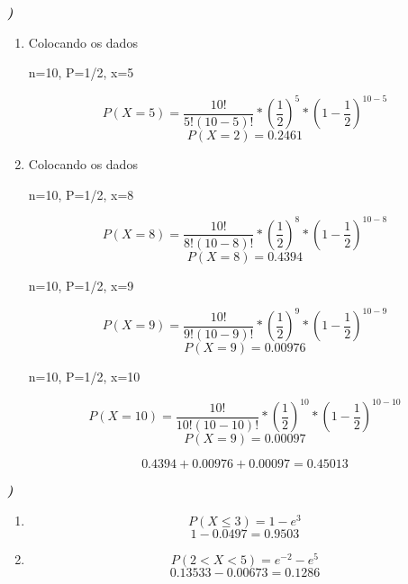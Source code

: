 \documentclass[12pt]{article}
\newcounter{instn}
\newcommand{\instnum}{\arabic{instn}}
\newcommand{\myline}[1]{
    \emph{\textbf{#1)}}
    \addtocounter{instn}{1}
}
\newenvironment{question}
 {
    \myline{\instnum} 
    }
    {
 }
\begin{document}
    \begin{question}
        \begin{enumerate}[label={\textbf{\alph*)}}]
            \item Colocando os dados 
            \begin{center}
                n=10, P=1/2, x=5
            \end{center}      
            \[
                P(X=5) = \frac{10!}{5!(10-5)!} * (\frac{1}{2})^{5}*(1-\frac{1}{2})^{10-5}
            \]
            \begin{equation}
                P(X=2) = 0.2461
            \end{equation}
            \item Colocando os dados 
            \begin{center}
                n=10, P=1/2, x=8
            \end{center}     
            \[
                P(X=8) = \frac{10!}{8!(10-8)!} * (\frac{1}{2})^{8}*(1-\frac{1}{2})^{10-8}
            \]
            \[
                P(X=8) = 0.4394
            \]
            \begin{center}
                n=10, P=1/2, x=9
            \end{center}     
            \[
                P(X=9) = \frac{10!}{9!(10-9)!} * (\frac{1}{2})^{9}*(1-\frac{1}{2})^{10-9}
            \]
            \[
                P(X=9) = 0.00976
            \]
            \begin{center}
                n=10, P=1/2, x=10
            \end{center}     
            \[
                P(X=10) = \frac{10!}{10!(10-10)!} * (\frac{1}{2})^{10}*(1-\frac{1}{2})^{10-10}
            \]
            \[
                P(X=9) = 0.00097
            \]

            \begin{equation}
                0.4394 + 0.00976 + 0.00097 = 0.45013
            \end{equation}
        \end{enumerate}
    \end{question}


    \begin{question}
        \begin{enumerate}[label={\textbf{\alph*)}}]
            \item 
            \[
                P(X \leq 3) = 1 - e^{3}   
            \]
            \begin{equation}
                1 - 0.0497 = 0.9503 
            \end{equation}
            \item 
            \[
                P(2 < X < 5) = e^{-2} - e^{5}   
            \]
            \begin{equation}
                0.13533 -0.00673 = 0.1286
            \end{equation}
        \end{enumerate}
    \end{question}
\end{document}
